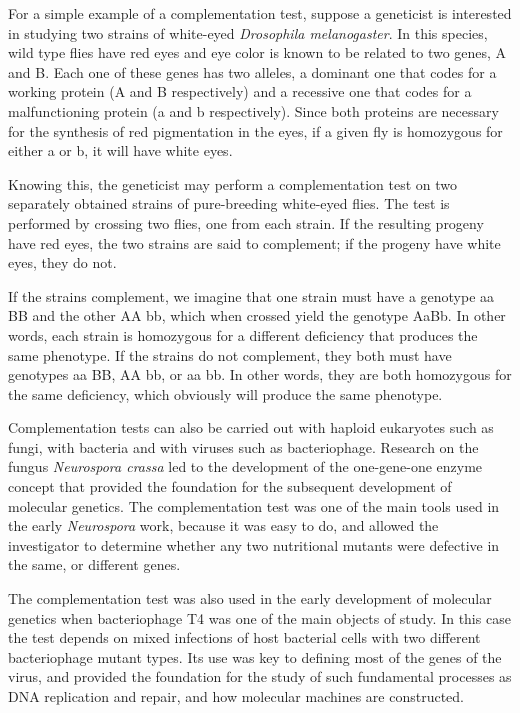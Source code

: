 For a simple example of a complementation test, suppose a geneticist is interested in studying two strains of white-eyed \emph{Drosophila melanogaster}. In this species, wild type flies have red eyes and eye color is known to be related to two genes, A and B. Each one of these genes has two alleles, a dominant one that codes for a working protein (A and B respectively) and a recessive one that codes for a malfunctioning protein (a and b respectively). Since both proteins are necessary for the synthesis of red pigmentation in the eyes, if a given fly is homozygous for either a or b, it will have white eyes.

Knowing this, the geneticist may perform a complementation test on two separately obtained strains of pure-breeding white-eyed flies. The test is performed by crossing two flies, one from each strain. If the resulting progeny have red eyes, the two strains are said to complement; if the progeny have white eyes, they do not.

If the strains complement, we imagine that one strain must have a genotype aa BB and the other AA bb, which when crossed yield the genotype AaBb. In other words, each strain is homozygous for a different deficiency that produces the same phenotype. If the strains do not complement, they both must have genotypes aa BB, AA bb, or aa bb. In other words, they are both homozygous for the same deficiency, which obviously will produce the same phenotype.

Complementation tests can also be carried out with haploid eukaryotes such as fungi, with bacteria and with viruses such as bacteriophage. Research on the fungus \emph{Neurospora crassa} led to the development of the one-gene-one enzyme concept that provided the foundation for the subsequent development of molecular genetics. The complementation test was one of the main tools used in the early \emph{Neurospora} work, because it was easy to do, and allowed the investigator to determine whether any two nutritional mutants were defective in the same, or different genes.

The complementation test was also used in the early development of molecular genetics when bacteriophage T4 was one of the main objects of study. In this case the test depends on mixed infections of host bacterial cells with two different bacteriophage mutant types. Its use was key to defining most of the genes of the virus, and provided the foundation for the study of such fundamental processes as DNA replication and repair, and how molecular machines are constructed.

